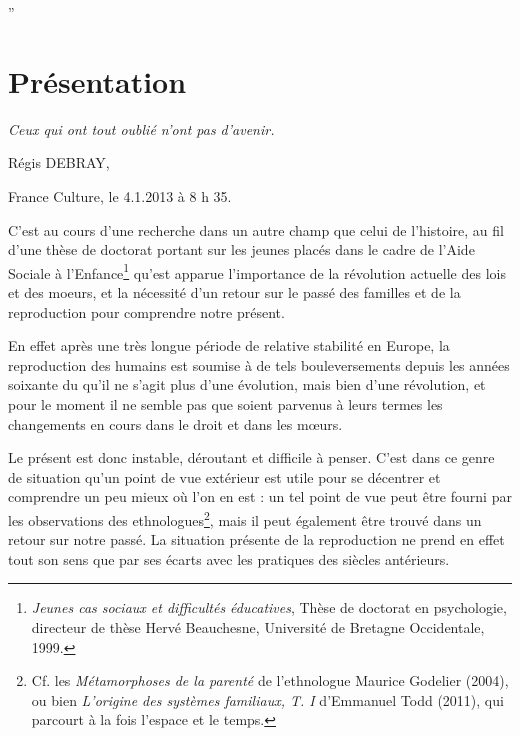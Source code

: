 

”\chapter{Présentation}

\emph{Ceux qui ont tout oublié n'ont pas d'avenir.}


Régis DEBRAY, 

France Culture, le 4.1.2013 à 8 h 35.






C'est au cours d'une recherche dans un autre champ que celui de l'histoire, au fil d'une thèse de doctorat portant sur les jeunes placés dans le cadre de l'Aide Sociale à l'Enfance\footnote{\emph{Jeunes cas sociaux et difficultés éducatives}, Thèse de doctorat en psychologie, directeur de thèse Hervé Beauchesne, Université de Bretagne Occidentale, 1999.} qu'est apparue l'importance de la révolution actuelle des lois et des moeurs, et la nécessité d'un retour sur le passé des familles et de la reproduction pour comprendre notre présent. 

En effet après une très longue période de relative stabilité en Europe, la reproduction des humains
est  soumise à de tels bouleversements depuis les années soixante du   
qu'il ne s'agit plus d'une évolution, mais bien d'une révolution, et pour le moment il
ne semble pas que soient parvenus à leurs termes les changements en
cours dans le droit et dans les mœurs. 

Le présent est donc instable, déroutant et difficile à penser. C'est dans ce genre de situation qu'un point de vue extérieur est utile pour se décentrer et comprendre un peu mieux où l'on en est : un tel point de vue peut être fourni par les observations des ethnologues\footnote{Cf. les \emph{Métamorphoses de la parenté} de l'ethnologue Maurice Godelier (2004), ou bien \emph{L'origine des systèmes familiaux, T. I} d'Emmanuel Todd (2011), qui parcourt à la fois l'espace et le temps.}, mais il peut également être trouvé dans un retour sur notre passé. La situation présente de la reproduction ne prend en effet tout son sens que par ses écarts avec les pratiques des siècles antérieurs.

